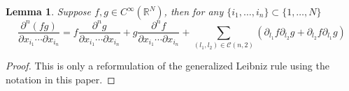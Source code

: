 \documentclass[10pt]{article}
\newtheorem{lemma}{Lemma}
\newcommand{\real}[1]{\ensuremath{\mathbb{R}^{ #1 }}}
\begin{document}
\begin{lemma} \label{lemma:generalLeibniz}
	Suppose $f,g\in C^\infty(\real{N})$, then for any $\{i_1,\ldots,i_n\}\subset\{1,\ldots,N\}$
	\begin{equation}
		\frac{\partial^n (fg)}{\partial x_{i_1} \cdots \partial x_{i_n}} = f\frac{\partial^{n} g}{\partial x_{i_1} \cdots \partial x_{i_n}} + g\frac{\partial^{n} f}{\partial x_{i_1} \cdots \partial x_{i_n}} + \sum_{(l_1,l_2)\in\mathcal{C}(n,2)} \left( \partial_{l_1}f\partial_{l_2}g + \partial_{l_2}f\partial_{l_1}g \right)
	\end{equation}
\end{lemma}
\begin{proof}
	This is only a reformulation of the generalized Leibniz rule using the notation in this paper.
\end{proof}
\end{document}
